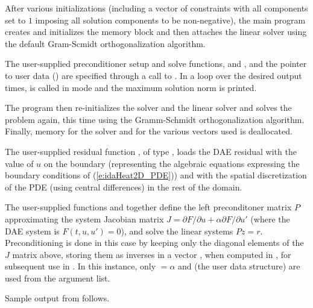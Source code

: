 After various initializations (including a vector of constraints with
all components set to $1$ imposing all solution components to be
non-negative), the main program creates and initializes the {\ida}
memory block and then attaches the {\idaspgmr} linear solver using the
default  Gram-Scmidt orthogonalization algorithm.

The user-supplied preconditioner setup and solve functions, 
and , and the pointer to user data () are specified
through a call to .
In a loop over the desired output times,  is called in 
mode and the maximum solution norm is printed.

The  program then re-initializes the {\ida} solver and the
{\idaspgmr} linear solver and solves the problem again, this time
using the  Gramm-Schmidt orthogonalization algorithm.
Finally, memory for the {\ida} solver and for the various vectors used is deallocated.

The user-supplied residual function , of type ,
loads the DAE residual with the value of $u$ on the boundary
(representing the algebraic equations expressing the boundary
conditions of (\ref{e:idaHeat2D_PDE})) and with the spatial discretization 
of the PDE (using central differences) in the rest of the domain.

The user-supplied functions  and  together define the 
left preconditoner matrix $P$ approximating the system Jacobian matrix
$J = \partial F/ \partial u + \alpha \partial F/ \partial u'$ (where the DAE
system is $F(t,u,u') = 0$), and solve the linear systems $P z = r$.   
Preconditioning  is done in this case by keeping only the diagonal elements of 
the $J$ matrix above, storing them as inverses in a vector , when computed
in , for subsequent use in .
In this instance, only  $=\alpha$ and  (the user data
structure) are used from the  argument list.

Sample output from  follows.
